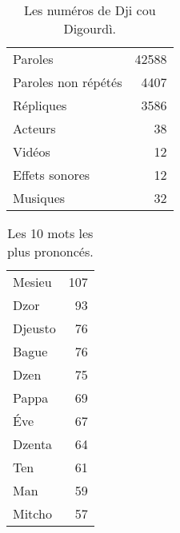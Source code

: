 
\vfill
\begin{table}[h]
\centering
\caption{Les numéros de Dji cou Digourdì.}
\begin{tabular}{lr}
    \toprule
Paroles & 42588 \\
Paroles non répétés & 4407 \\
Répliques & 3586 \\
Acteurs & 38 \\
Vidéos & 12 \\
Effets sonores & 12 \\
Musiques & 32 \\
\bottomrule
\end{tabular}%
\end{table}
\vfill
\newpage
\vfill
\begin{table}[h]
\centering
\caption{Les 10 mots les plus prononcés.}
\begin{tabular}{lr}
    \toprule

\multicolumn{1}{l}{Mesieu} &107\\
\multicolumn{1}{l}{Dzor} &93\\
\multicolumn{1}{l}{Djeusto} &76\\
\multicolumn{1}{l}{Bague} &76\\
\multicolumn{1}{l}{Dzen} &75\\
\multicolumn{1}{l}{Pappa} &69\\
\multicolumn{1}{l}{Éve} &67\\
\multicolumn{1}{l}{Dzenta} &64\\
\multicolumn{1}{l}{Ten} &61\\
\multicolumn{1}{l}{Man} &59\\
\multicolumn{1}{l}{Mitcho} &57\\
\bottomrule
\end{tabular}%
\end{table}
\vfill
\newpage
\scriptsize
